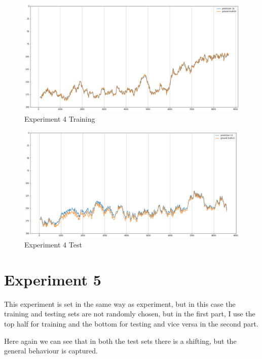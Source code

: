 \documentclass[a4paper]{article}
\begin{document}
\begin{figure}[h]
  \centering
  \includegraphics[width=\textwidth]{exp 4 train}
  \caption{Experiment 4 Training}
  \label{fig:exp4train}
\end{figure}

\begin{figure}[h]
  \centering
  \includegraphics[width=\textwidth]{exp 4 test}
  \caption{Experiment 4 Test}
  \label{fig:exp4test}
\end{figure}

\section{Experiment 5}
This experiment is set in the same way as experiment, but in this case the training and testing sets are not randomly chosen, but in the first part, I use the top half for training and the bottom for testing and vice versa in the second part.

Here again we can see that in both the test sets there is a shifting, but the general behaviour is captured.
\end{document}
